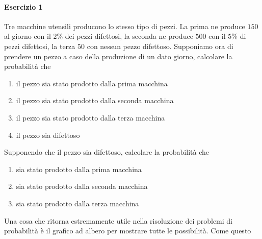 \paragraph{Esercizio 1}
Tre macchine utensili producono lo stesso tipo di pezzi. La prima ne produce $150$ al giorno con il 
$2\%$ dei pezzi difettosi, la seconda ne produce $500$ con il $5\%$ di pezzi difettosi, la terza
$50$ con nessun pezzo difettoso. Supponiamo ora di prendere un pezzo a caso della produzione di un 
dato giorno, calcolare la probabilità che
\begin{enumerate}
	\item il pezzo sia stato prodotto dalla prima macchina
	\item il pezzo sia stato prodotto dalla seconda macchina
	\item il pezzo sia stato prodotto dalla terza macchina
	\item il pezzo sia difettoso
\end{enumerate}
Supponendo che il pezzo sia difettoso, calcolare la probabilità che
\begin{enumerate}
	\item sia stato prodotto dalla prima macchina
	\item sia stato prodotto dalla seconda macchina
	\item sia stato prodotto dalla terza macchina
\end{enumerate}
\divisor

Una cosa che ritorna estremamente utile nella risoluzione dei problemi di probabilità è il grafico ad
albero per mostrare tutte le possibilità. Come questo

\begin{center}
\end{center} 


